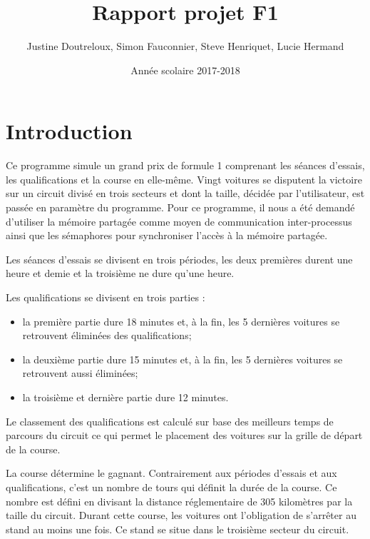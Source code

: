 \documentclass[11pt,a4paper]{article}
\title{Rapport projet F1}
\author{Justine Doutreloux, Simon Fauconnier, Steve Henriquet, Lucie Hermand}
\date{Année scolaire 2017-2018}
\begin{document}
\maketitle

\newpage
\tableofcontents

\newpage
\part{Introduction}

Ce programme simule un grand prix de formule 1 comprenant les séances d'essais, les qualifications et la course en elle-même. Vingt voitures se disputent la victoire sur un circuit divisé en trois secteurs et dont la taille, décidée par l'utilisateur, est passée en paramètre du programme.
Pour ce programme, il nous a été demandé d'utiliser la mémoire partagée comme moyen de communication inter-processus ainsi que les sémaphores pour synchroniser l'accès à la mémoire partagée.\par
Les séances d'essais se divisent en trois périodes, les deux premières durent une heure et demie et la troisième ne dure qu'une heure.\par
Les qualifications se divisent en trois parties :
\begin{itemize}
\item  la première partie dure 18 minutes et, à la fin, les 5 dernières voitures se retrouvent éliminées des qualifications;
\item la deuxième partie dure 15 minutes et, à la fin, les 5 dernières voitures se retrouvent aussi éliminées;
\item la troisième et dernière partie dure 12 minutes.
\end{itemize}

Le classement des qualifications est calculé sur base des meilleurs temps de parcours du circuit ce qui permet le placement des voitures sur la grille de départ de la course.\par
La course détermine le gagnant. Contrairement aux périodes d'essais et aux qualifications, c'est un nombre de tours qui définit la durée de la course. Ce nombre est défini en divisant la distance réglementaire de 305 kilomètres par la taille du circuit. Durant cette course, les voitures ont l'obligation de s'arrêter au stand au moins une fois. Ce stand se situe dans le troisième secteur du circuit.\\
\\
\end{document}
